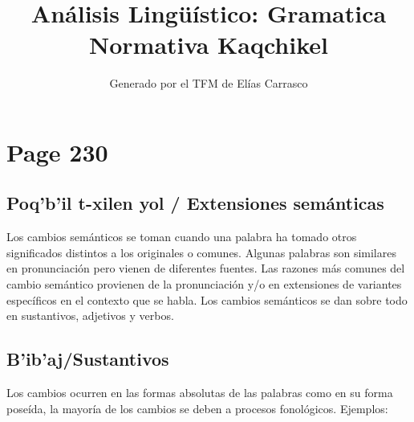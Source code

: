 \documentclass{article}%
\title{Análisis Lingüístico: Gramatica Normativa Kaqchikel}%
\author{Generado por el TFM de Elías Carrasco}%
\begin{document}
%
\normalsize%
\maketitle%
\section{Page 230}%
\label{sec:Page230}%
\subsection{Poq’b’il t{-}xilen yol / Extensiones semánticas}%
\label{subsec:Poqbilt{-}xilenyol/Extensionessemnticas}%

%
Los cambios semánticos se toman cuando una palabra ha tomado otros significados distintos a los originales o comunes. Algunas palabras son similares en pronunciación pero vienen de diferentes fuentes. %
Las razones más comunes del cambio semántico provienen de la pronunciación y/o en extensiones de variantes específicos en el contexto que se habla. %
Los cambios semánticos se dan sobre todo en sustantivos, adjetivos y verbos. %
\subsection{B’ib’aj/Sustantivos}%
\label{subsec:Bibaj/Sustantivos}%

%
Los cambios ocurren en las formas absolutas de las palabras como en su forma poseída, la mayoría de los cambios se deben a procesos fonológicos. %
Ejemplos: 

%
\end{document}
